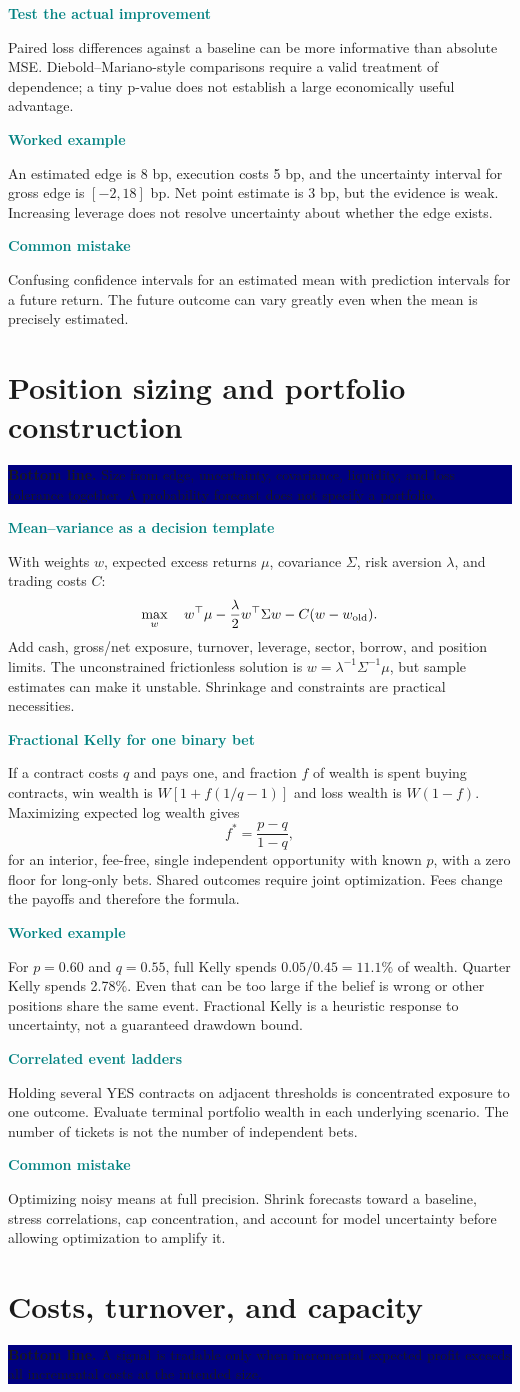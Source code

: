 \documentclass[10pt,letterpaper]{article}
\newcommand{\bl}[1]{\noindent\colorbox{navy}{\parbox{\dimexpr\linewidth-2\fboxsep}{\color{white}\textbf{Bottom line.} #1}}\par\medskip}
\newcommand{\topic}[2]{\clearpage\section{#1}\bl{#2}}
\newcommand{\sub}[1]{\par\textbf{\textcolor{teal}{#1}}\par}
\newcommand{\ex}[1]{\sub{Worked example}#1}
\newcommand{\pit}[1]{\sub{Common mistake}#1}
\begin{document}
\sub{Test the actual improvement}
Paired loss differences against a baseline can be more informative than absolute MSE. Diebold--Mariano-style comparisons require a valid treatment of dependence; a tiny p-value does not establish a large economically useful advantage.
\ex{An estimated edge is 8 bp, execution costs 5 bp, and the uncertainty interval for gross edge is $[-2,18]$ bp. Net point estimate is 3 bp, but the evidence is weak. Increasing leverage does not resolve uncertainty about whether the edge exists.}
\pit{Confusing confidence intervals for an estimated mean with prediction intervals for a future return. The future outcome can vary greatly even when the mean is precisely estimated.}
\topic{Position sizing and portfolio construction}{Size from edge, uncertainty, covariance, liquidity, and loss tolerance together. A probability forecast does not specify a portfolio.}
\sub{Mean--variance as a decision template}
With weights $w$, expected excess returns $\mu$, covariance $\Sigma$, risk aversion $\lambda$, and trading costs $C$:
\[\max_w\quad w^\top\mu-\frac{\lambda}{2}w^\top\Sigma w-C(w-w_{\rm old}).\]
Add cash, gross/net exposure, turnover, leverage, sector, borrow, and position limits. The unconstrained frictionless solution is $w=\lambda^{-1}\Sigma^{-1}\mu$, but sample estimates can make it unstable. Shrinkage and constraints are practical necessities.
\sub{Fractional Kelly for one binary bet}
If a contract costs $q$ and pays one, and fraction $f$ of wealth is spent buying contracts, win wealth is $W[1+f(1/q-1)]$ and loss wealth is $W(1-f)$. Maximizing expected log wealth gives
\[f^*=\frac{p-q}{1-q},\]
for an interior, fee-free, single independent opportunity with known $p$, with a zero floor for long-only bets. Shared outcomes require joint optimization. Fees change the payoffs and therefore the formula.
\ex{For $p=0.60$ and $q=0.55$, full Kelly spends $0.05/0.45=11.1\%$ of wealth. Quarter Kelly spends 2.78\%. Even that can be too large if the belief is wrong or other positions share the same event. Fractional Kelly is a heuristic response to uncertainty, not a guaranteed drawdown bound.}
\sub{Correlated event ladders}
Holding several YES contracts on adjacent thresholds is concentrated exposure to one outcome. Evaluate terminal portfolio wealth in each underlying scenario. The number of tickets is not the number of independent bets.
\pit{Optimizing noisy means at full precision. Shrink forecasts toward a baseline, stress correlations, cap concentration, and account for model uncertainty before allowing optimization to amplify it.}
\topic{Costs, turnover, and capacity}{A signal is tradable only when incremental expected profit exceeds all incremental costs at the intended size.}
\end{document}
